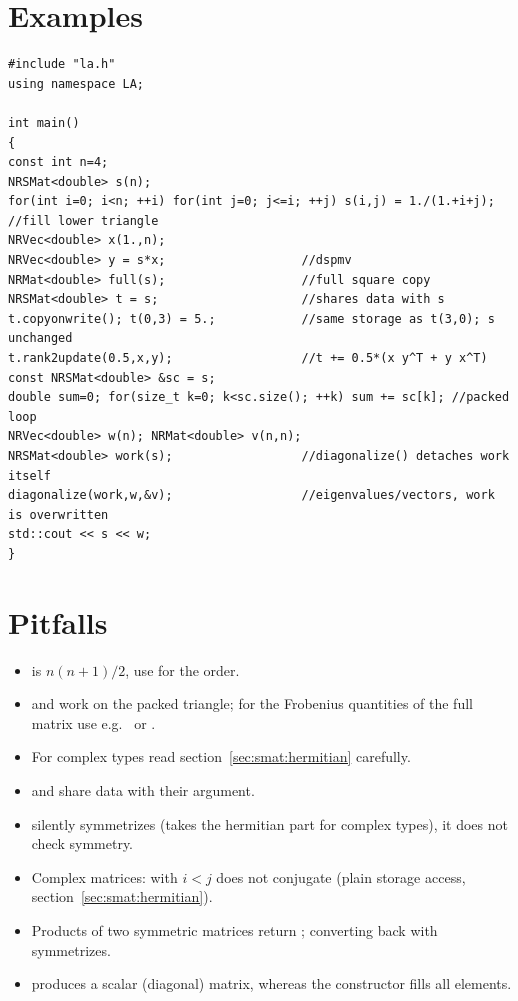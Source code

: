 \section{Examples}\label{sec:smat:examples}
\begin{lstlisting}
#include "la.h"
using namespace LA;

int main()
{
const int n=4;
NRSMat<double> s(n);
for(int i=0; i<n; ++i) for(int j=0; j<=i; ++j) s(i,j) = 1./(1.+i+j); //fill lower triangle
NRVec<double> x(1.,n);
NRVec<double> y = s*x;                   //dspmv
NRMat<double> full(s);                   //full square copy
NRSMat<double> t = s;                    //shares data with s
t.copyonwrite(); t(0,3) = 5.;            //same storage as t(3,0); s unchanged
t.rank2update(0.5,x,y);                  //t += 0.5*(x y^T + y x^T)
const NRSMat<double> &sc = s;
double sum=0; for(size_t k=0; k<sc.size(); ++k) sum += sc[k]; //packed loop
NRVec<double> w(n); NRMat<double> v(n,n);
NRSMat<double> work(s);                  //diagonalize() detaches work itself
diagonalize(work,w,&v);                  //eigenvalues/vectors, work is overwritten
std::cout << s << w;
}
\end{lstlisting}

\section{Pitfalls}\label{sec:smat:pitfalls}
\begin{itemize}
\item {} is $n(n+1)/2$, use  for the order.
\item {} and  work on the packed triangle; for the Frobenius quantities of the
  full matrix use e.g.\  or .
\item For complex types read section~\ref{sec:smat:hermitian} carefully.
\item {} and  share data with their argument.
\item {} silently symmetrizes (takes the hermitian part for complex types), it does not check symmetry.
\item Complex matrices:  with $i<j$ does not conjugate (plain storage access, section~\ref{sec:smat:hermitian}).
\item Products of two symmetric matrices return ; converting back with  symmetrizes.
\item {} produces a scalar (diagonal) matrix, whereas the constructor  fills all elements.
\end{itemize}
